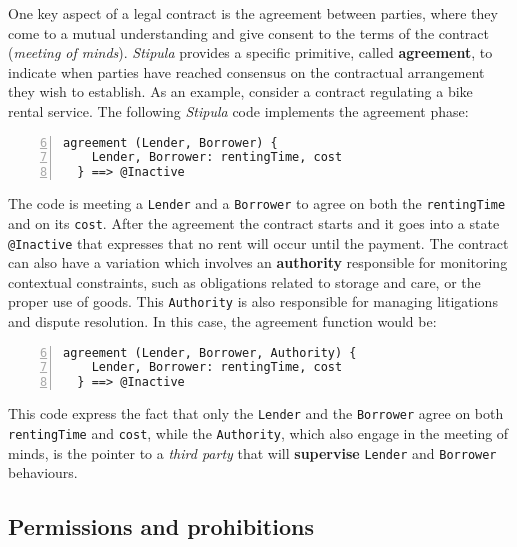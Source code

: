 One key aspect of a legal contract is the agreement between parties, where they come to a mutual 
understanding and give consent to the terms of the contract (\textit{meeting of minds}). \textit{Stipula} 
provides a specific primitive, called \textbf{agreement}, to indicate when parties have reached consensus 
on the contractual arrangement they wish to establish. As an example, consider a contract regulating a 
bike rental service. The following \textit{Stipula} code implements the agreement phase:

\begin{Verbatim}[numbers=left,xleftmargin=1cm,firstnumber=6,breaklines=true,breakanywhere=true,tabsize=2]
  agreement (Lender, Borrower) {
    Lender, Borrower: rentingTime, cost 
  } ==> @Inactive
\end{Verbatim}

The code is meeting a \verb|Lender| and a \verb|Borrower| to agree on both the \verb|rentingTime| and on 
its \verb|cost|. After the agreement the contract starts and it goes into a state \verb|@Inactive| that 
expresses that no rent will occur until the payment. The contract can also have a variation which involves 
an \textbf{authority} responsible for monitoring contextual constraints, such as obligations related to 
storage and care, or the proper use of goods. This \verb|Authority| is also responsible for managing 
litigations and dispute resolution. In this case, the agreement function would be:

\begin{Verbatim}[numbers=left,xleftmargin=1cm,firstnumber=6,breaklines=true,breakanywhere=true,tabsize=2]
  agreement (Lender, Borrower, Authority) {
    Lender, Borrower: rentingTime, cost 
  } ==> @Inactive
\end{Verbatim}

This code express the fact that only the \verb|Lender| and the \verb|Borrower| agree on both 
\verb|rentingTime| and \verb|cost|, while the \verb|Authority|, which also engage in the meeting of minds, 
is the pointer to a \textit{third party} that will \textbf{supervise} \verb|Lender| and \verb|Borrower| 
behaviours.

\subsection{Permissions and prohibitions}

